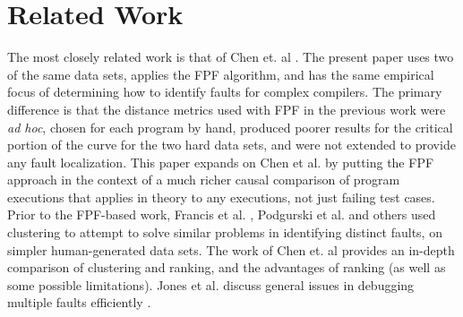 \section{Related Work}
\label{sec:related}

 
The most closely related work is that of Chen et. al \cite{PLDI13}.  The present paper uses two of the same data sets, applies the FPF \cite{Gonzalez} algorithm, and has the same empirical focus of determining how to identify faults for complex compilers.  The primary difference is that the distance metrics used with FPF in the previous work were \emph{ad hoc}, chosen for each program by hand, produced poorer results for the critical portion of the curve for the two hard data sets, and were not extended to provide any fault localization.  This paper expands on Chen et al. by putting the FPF approach in the context of a much richer causal comparison of program executions that applies in theory to any executions, not just failing test cases.  Prior to the FPF-based work, Francis et al. \cite{Podgurski04}, Podgurski et al. \cite{Podgurski03} and others \cite{Liu06,Liblit05} used clustering to attempt to solve similar problems in identifying distinct faults, on simpler human-generated data sets.  The work of Chen et. al \cite{PLDI13} provides an in-depth comparison of clustering and ranking, and the advantages of ranking (as well as some possible limitations).  Jones et al. discuss general issues in debugging multiple faults efficiently \cite{Jones07}.

